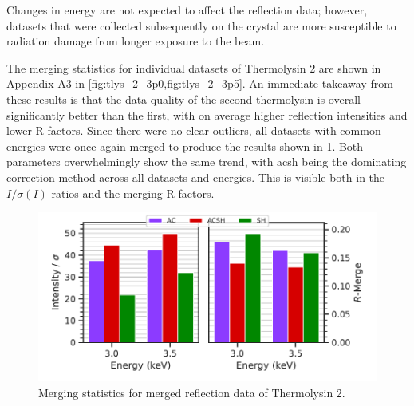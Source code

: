 Changes in energy are not expected to affect the reflection data; however, datasets that were collected subsequently on the crystal are more susceptible to radiation damage from longer exposure to the beam.%


The merging statistics for individual datasets of Thermolysin 2 are shown in Appendix A3 in \cref{fig:tlys_2_3p0,fig:tlys_2_3p5}. An immediate takeaway from these results is that the data quality of the second thermolysin is overall significantly better than the first, with on average higher reflection intensities and lower R-factors. Since there were no clear outliers, all datasets with common energies were once again merged to produce the results shown in \cref{fig:tlys_2_stats}. Both parameters overwhelmingly show the same trend, with \ac{acsh} being the dominating correction method across all datasets and energies. This is visible both in the $I/\sigma(I)$ ratios and the merging R factors.

\begin{figure}
    \centering
    \includegraphics{plots/exp1/tlys_2_P6122/merged_stats.pdf}
    \caption{Merging statistics for merged reflection data of Thermolysin 2.}
    \label{fig:tlys_2_stats}
\end{figure}


